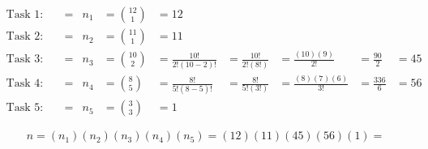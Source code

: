     \begin{mdframed}
        \begin{align*}
            \text{Task 1: Assign the first character as R} & = & n_1 & = {12 \choose 1} & = 12 &    \\
            \text{Task 2: Assign the last character as B} & = & n_2 & = {11 \choose 1} & = 11 &     \\
            \text{Task 3: Assign the remaining R's} & = & n_3 & = {10 \choose 2} & = \frac{10!}{2!(10-2)!} & = \frac{10!}{2!(8!)} & = \frac{(10)(9)}{2!} & = \frac{90}{2} & = 45    \\
            \text{Task 4: Assign the 5 G's} & = & n_4 & = {8 \choose 5} & = \frac{8!}{5!(8-5)!} & = \frac{8!}{5!(3!)} & = \frac{(8)(7)(6)}{3!} & = \frac{336}{6} & = 56 \\
            \text{Task 5: Assign the remaining B's} & = & n_5 & = {3 \choose 3} & = 1
        \end{align*}

        \begin{equation*}
            n = (n_1)(n_2)(n_3)(n_4)(n_5) = (12)(11)(45)(56)(1) = 
        \end{equation*}
    \end{mdframed}

